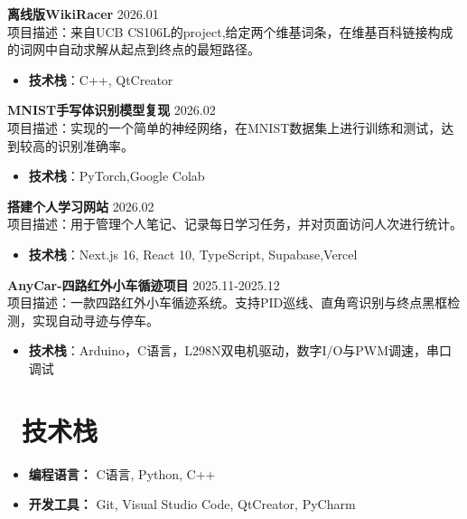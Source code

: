 \documentclass[11pt]{article}
\newlength{\interProjectSpacing}
\newcommand{\projectsep}{\vspace{\interProjectSpacing}}
\newlength{\intraProjectTitleSep}
\newcommand{\titlebreak}{\\[\intraProjectTitleSep]}
\newlength{\intraProjectListTopSep}
\begin{document}
\textbf{离线版WikiRacer} \hfill 2026.01 \titlebreak
项目描述：来自UCB CS106L的project,给定两个维基词条，在维基百科链接构成的词网中自动求解从起点到终点的最短路径。
\begin{itemize}[nosep, topsep=\intraProjectListTopSep]
    \item \textbf{技术栈}：C++, QtCreator
\end{itemize}

\projectsep

\textbf{MNIST手写体识别模型复现} \hfill 2026.02 \titlebreak
项目描述：实现的一个简单的神经网络，在MNIST数据集上进行训练和测试，达到较高的识别准确率。
\begin{itemize}[nosep, topsep=\intraProjectListTopSep]
    \item \textbf{技术栈}：PyTorch,Google Colab
\end{itemize}

\projectsep

\textbf{搭建个人学习网站} \hfill 2026.02 \titlebreak
项目描述：用于管理个人笔记、记录每日学习任务，并对页面访问人次进行统计。
\begin{itemize}[nosep, topsep=\intraProjectListTopSep]
    \item \textbf{技术栈}：Next.js 16, React 10, TypeScript, Supabase,Vercel
\end{itemize}

\projectsep

\textbf{AnyCar-四路红外小车循迹项目} \hfill 2025.11-2025.12 \titlebreak
项目描述：一款四路红外小车循迹系统。支持PID巡线、直角弯识别与终点黑框检测，实现自动寻迹与停车。
\begin{itemize}[nosep, topsep=\intraProjectListTopSep]
    \item \textbf{技术栈}：Arduino，C语言，L298N双电机驱动，数字I/O与PWM调速，串口调试
\end{itemize}

\section{\makebox[\widthof{\faCogs}][c]{\color{CVBlue}\faCogs}\ 技术栈}
\begin{itemize}[nosep]
    \item \textbf{编程语言：} C语言, Python, C++
    \item \textbf{开发工具：} Git, Visual Studio Code, QtCreator, PyCharm
\end{itemize}
\end{document}
